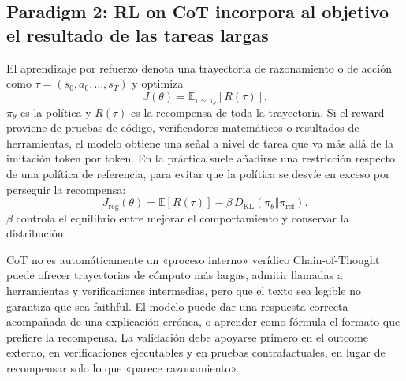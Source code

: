 \subsection{Paradigm 2: RL on CoT incorpora al objetivo el resultado de las tareas largas}

El aprendizaje por refuerzo denota una trayectoria de razonamiento o de acción como $\tau=(s_0,a_0,\dots,s_T)$ y optimiza
\[
J(\theta)=\mathbb{E}_{\tau\sim\pi_{\theta}}[R(\tau)].
\]
$\pi_\theta$ es la política y $R(\tau)$ es la recompensa de toda la trayectoria. Si el reward proviene de pruebas de código, verificadores matemáticos o resultados de herramientas, el modelo obtiene una señal a nivel de tarea que va más allá de la imitación token por token. En la práctica suele añadirse una restricción respecto de una política de referencia, para evitar que la política se desvíe en exceso por perseguir la recompensa:
\[
J_{\text{reg}}(\theta)=\mathbb{E}[R(\tau)]
-\beta\,D_{\mathrm{KL}}(\pi_{\theta}\Vert\pi_{\mathrm{ref}}).
\]
$\beta$ controla el equilibrio entre mejorar el comportamiento y conservar la distribución.


\begin{warningbox}{CoT no es automáticamente un «proceso interno» verídico}
Chain-of-Thought puede ofrecer trayectorias de cómputo más largas, admitir llamadas a herramientas y verificaciones intermedias, pero que el texto sea legible no garantiza que sea faithful. El modelo puede dar una respuesta correcta acompañada de una explicación errónea, o aprender como fórmula el formato que prefiere la recompensa. La validación debe apoyarse primero en el outcome externo, en verificaciones ejecutables y en pruebas contrafactuales, en lugar de recompensar solo lo que «parece razonamiento».
\end{warningbox}



